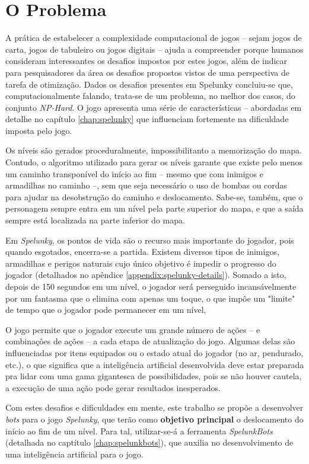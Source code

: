 \chapter{\label{chap:problem}O Problema}
A prática de estabelecer a complexidade computacional de jogos -- sejam jogos de
carta, jogos de tabuleiro ou jogos digitais -- ajuda a compreender  porque
humanos consideram interessantes os desafios impostos por estes jogos, além de
indicar para pesquisadores da área os desafios propostos vistos de uma
perspectiva de tarefa de otimização.  Dados os desafios presentes em Spelunky
concluiu-se que, computacionalmente falando, trata-se de um problema, no melhor
dos casos, do conjunto \textit{NP-Hard}\cite{SPELUNKYHARD}. O jogo apresenta uma
série de características -- abordadas em detalhe no capítulo \ref{chap:spelunky}
que influenciam fortemente na dificuldade imposta pelo jogo.

Os níveis são gerados proceduralmente, impossibilitanto a memorização do mapa.
Contudo, o algoritmo utilizado para gerar os níveis garante que existe pelo
menos um caminho transponível do início ao fim -- mesmo que com inimigos e
armadilhas no caminho --, sem que seja necessário o uso de bombas ou cordas para
ajudar na desobstrução do caminho e deslocamento. Sabe-se, também, que o
personagem sempre entra em um nível pela parte superior do mapa, e que a saída
sempre está localizada na parte inferior do mapa.

Em \textit{Spelunky}, os pontos de vida são o recurso mais importante do
jogador, pois quando esgotados, encerra-se a partida. Existem diversos tipos de
inimigos, armadilhas e perigos naturais cujo único objetivo é impedir o
progresso do jogador (detalhados no apêndice \ref{appendix:spelunky-details}).
Somado a isto, depois de 150 segundos em um nível, o jogador será perseguido
incansávelmente por um fantasma que o elimina com apenas um toque, o que impõe
um "limite" de tempo que o jogador pode permanecer em um nível,

O jogo permite que o jogador execute um grande número de ações -- e combinações
de ações -- a cada etapa de atualização do jogo. Algumas delas são influenciadas
por itens equipados ou o estado atual do jogador (no ar, pendurado, etc.), o que
significa que a inteligência artificial desenvolvida deve estar preparada pra
lidar com uma gama gigantesca de possibilidades, pois se não houver cautela, a
execução de uma ação pode gerar resultados inesperados. 

Com estes desafios e dificuldades em mente, este trabalho se propõe a
desenvolver \textit{bots} para o jogo \textit{Spelunky}, que terão como
\textbf{objetivo principal} o deslocamento do início ao fim de um nível. Para
tal, utilizar-se-á a ferramenta \textit{SpelunkBots} (detalhada no captítulo
\ref{chap:spelunkbots}), que auxilia no desenvolvimento de uma inteligência
artificial para o jogo.

